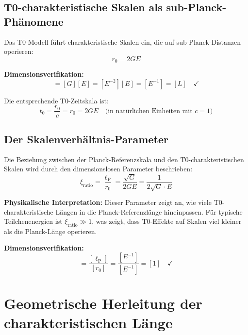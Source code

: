 \documentclass[12pt,a4paper]{report}
\newcommand{\lP}{\ell_{\text{P}}}         %
\newcommand{\rzero}{r_0}                  %
\newcommand{\tzero}{t_0}                  %
\newcommand{\xirat}{\xi_{\text{ratio}}}   %
\begin{document}
	\subsection{T0-charakteristische Skalen als sub-Planck-Phänomene}\label{subsec:t0_sub_planck}
	
	Das T0-Modell führt charakteristische Skalen ein, die auf sub-Planck-Distanzen operieren:
	\begin{equation}
		\boxed{\rzero = 2GE}
		\label{eq:t0_characteristic_length}
	\end{equation}
	
	\textbf{Dimensionsverifikation:}
	\begin{equation}
		[\rzero] = [G][E] = [E^{-2}][E] = [E^{-1}] = [L] \quad \checkmark
	\end{equation}
	
	Die entsprechende T0-Zeitskala ist:
	\begin{equation}
		\tzero = \frac{\rzero}{c} = \rzero = 2GE \quad \text{(in natürlichen Einheiten mit } c = 1\text{)}
	\end{equation}
	
	\subsection{Der Skalenverhältnis-Parameter}\label{subsec:scale_ratio}
	
	Die Beziehung zwischen der Planck-Referenzskala und den T0-charakteristischen Skalen wird durch den dimensionslosen Parameter beschrieben:
	\begin{equation}
		\boxed{\xirat = \frac{\lP}{\rzero} = \frac{\sqrt{G}}{2GE} = \frac{1}{2\sqrt{G} \cdot E}}
		\label{eq:scale_ratio}
	\end{equation}
	
	\textbf{Physikalische Interpretation:} Dieser Parameter zeigt an, wie viele T0-charakteristische Längen in die Planck-Referenzlänge hineinpassen. Für typische Teilchenenergien ist $\xirat \gg 1$, was zeigt, dass T0-Effekte auf Skalen viel kleiner als die Planck-Länge operieren.
	
	\textbf{Dimensionsverifikation:}
	\begin{equation}
		[\xi] = \frac{[\lP]}{[\rzero]} = \frac{[E^{-1}]}{[E^{-1}]} = [1] \quad \checkmark
	\end{equation}
	
	\section{Geometrische Herleitung der charakteristischen Länge}\label{sec:geometric_derivation}
	
\end{document}
